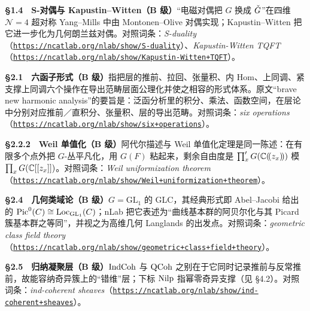 \smallskip
\noindent\textbf{§1.4　S-对偶与 Kapustin--Witten（B 级）}\quad “电磁对偶把 $G$ 换成 $\check{G}$”在四维 $\mathcal{N}=4$ 超对称 Yang--Mills 中由 Montonen--Olive 对偶实现；Kapustin--Witten 把它进一步化为几何朗兰兹对偶。对照词条：\emph{S-duality}（\href{https://ncatlab.org/nlab/show/S-duality}{\texttt{https:/\allowbreak{}/\allowbreak{}ncatlab.\allowbreak{}org/\allowbreak{}nlab/\allowbreak{}show/\allowbreak{}S-duality}}）、\emph{Kapustin-Witten TQFT}（\href{https://ncatlab.org/nlab/show/Kapustin-Witten+TQFT}{\texttt{https:/\allowbreak{}/\allowbreak{}ncatlab.\allowbreak{}org/\allowbreak{}nlab/\allowbreak{}show/\allowbreak{}Kapustin-Witten+\allowbreak{}TQFT}}）。

\smallskip
\noindent\textbf{§2.1　六函子形式（B 级）}\quad 指把层的推前、拉回、张量积、内 Hom、上同调、紧支撑上同调六个操作在导出范畴层面公理化并使之相容的形式体系。原文“brave new harmonic analysis”的要旨是：泛函分析里的积分、乘法、函数空间，在层论中分别对应推前／直积分、张量积、层的导出范畴。对照词条：\emph{six operations}（\href{https://ncatlab.org/nlab/show/six+operations}{\texttt{https:/\allowbreak{}/\allowbreak{}ncatlab.\allowbreak{}org/\allowbreak{}nlab/\allowbreak{}show/\allowbreak{}six+\allowbreak{}operations}}）。

\smallskip
\noindent\textbf{§2.2.2　Weil 单值化（B 级）}\quad 阿代尔描述与 Weil 单值化定理是同一陈述：在有限多个点外把 $G$-丛平凡化，用 $G(F)$ 粘起来，剩余自由度是 $\prod'_{x}G(\mathbb{C}(\!(z_{x})\!))$ 模 $\prod_{x}G(\mathbb{C}[[z_{x}]])$。对照词条：\emph{Weil uniformization theorem}（\href{https://ncatlab.org/nlab/show/Weil+uniformization+theorem}{\texttt{https:/\allowbreak{}/\allowbreak{}ncatlab.\allowbreak{}org/\allowbreak{}nlab/\allowbreak{}show/\allowbreak{}Weil+\allowbreak{}uniformization+\allowbreak{}theorem}}）。

\smallskip
\noindent\textbf{§2.4　几何类域论（B 级）}\quad $G=\mathrm{GL}_{1}$ 的 GLC，其经典形式即 Abel--Jacobi 给出的 $\mathrm{Pic}^{0}(C)\cong\operatorname{Loc}_{\mathrm{GL}_{1}}(C)$；nLab 把它表述为“曲线基本群的阿贝尔化与其 Picard 簇基本群之等同”，并视之为高维几何 Langlands 的出发点。对照词条：\emph{geometric class field theory}（\href{https://ncatlab.org/nlab/show/geometric+class+field+theory}{\texttt{https:/\allowbreak{}/\allowbreak{}ncatlab.\allowbreak{}org/\allowbreak{}nlab/\allowbreak{}show/\allowbreak{}geometric+\allowbreak{}class+\allowbreak{}field+\allowbreak{}theory}}）。

\smallskip
\noindent\textbf{§2.5　归纳凝聚层（B 级）}\quad $\operatorname{IndCoh}$ 与 $\operatorname{QCoh}$ 之别在于它同时记录推前与反常推前，故能容纳奇异簇上的“错维”层；下标 $\operatorname{Nilp}$ 指幂零奇异支撑（见 §4.2）。对照词条：\emph{ind-coherent sheaves}（\href{https://ncatlab.org/nlab/show/ind-coherent+sheaves}{\texttt{https:/\allowbreak{}/\allowbreak{}ncatlab.\allowbreak{}org/\allowbreak{}nlab/\allowbreak{}show/\allowbreak{}ind-coherent+\allowbreak{}sheaves}}）。

